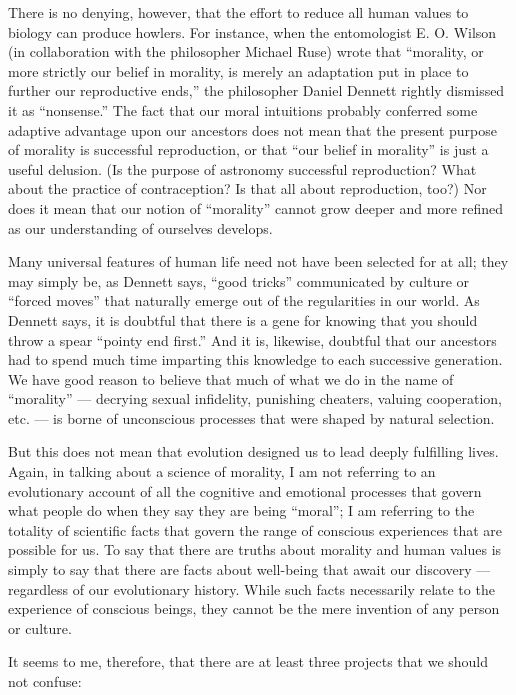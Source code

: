 \documentclass[a4paper,14pt]{extbook}
\begin{document}
There is no denying, however, that the effort to reduce all human values to biology can produce howlers.
For instance, when the entomologist E. O. Wilson (in collaboration with the philosopher Michael Ruse) wrote that ``morality, or more strictly our belief in morality, is merely an adaptation put in place to further our reproductive ends,'' the philosopher Daniel Dennett rightly dismissed it as ``nonsense.''
The fact that our moral intuitions probably conferred some adaptive advantage upon our ancestors does not mean that the present purpose of morality is successful reproduction, or that ``our belief in morality'' is just a useful delusion.
(Is the purpose of astronomy successful reproduction?
What about the practice of contraception?
Is that all about reproduction, too?)
Nor does it mean that our notion of ``morality'' cannot grow deeper and more refined as our understanding of ourselves develops.

Many universal features of human life need not have been selected for at all;
they may simply be, as Dennett says, ``good tricks'' communicated by culture or ``forced moves'' that naturally emerge out of the regularities in our world.
As Dennett says, it is doubtful that there is a gene for knowing that you should throw a spear ``pointy end first.''
And it is, likewise, doubtful that our ancestors had to spend much time imparting this knowledge to each successive generation.
We have good reason to believe that much of what we do in the name of ``morality'' --- decrying sexual infidelity, punishing cheaters, valuing cooperation, etc. --- is borne of unconscious processes that were shaped by natural selection.

But this does not mean that evolution designed us to lead deeply fulfilling lives.
Again, in talking about a science of morality, I am not referring to an evolutionary account of all the cognitive and emotional processes that govern what people do when they say they are being ``moral'';
I am referring to the totality of scientific facts that govern the range of conscious experiences that are possible for us.
To say that there are truths about morality and human values is simply to say that there are facts about well-being that await our discovery --- regardless of our evolutionary history.
While such facts necessarily relate to the experience of conscious beings, they cannot be the mere invention of any person or culture.

It seems to me, therefore, that there are at least three projects that we should not confuse:
\end{document}
